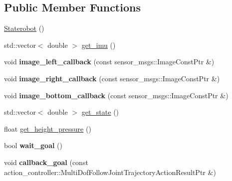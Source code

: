 \subsection*{Public Member Functions}
\begin{DoxyCompactItemize}
\item 
\hyperlink{class_staterobot_ab99a92f98d724c96989a744aee273155}{Staterobot} ()
\item 
std\-::vector$<$ double $>$ \hyperlink{class_staterobot_a50e002ec81917b295a87463127648a52}{get\-\_\-imu} ()
\item 
\hypertarget{class_staterobot_a4cb41f60186d02b210f354d0199584a4}{void {\bfseries image\-\_\-left\-\_\-callback} (const sensor\-\_\-msgs\-::\-Image\-Const\-Ptr \&)}\label{class_staterobot_a4cb41f60186d02b210f354d0199584a4}

\item 
\hypertarget{class_staterobot_af908b8a70811f3c0a48efe323610602d}{void {\bfseries image\-\_\-right\-\_\-callback} (const sensor\-\_\-msgs\-::\-Image\-Const\-Ptr \&)}\label{class_staterobot_af908b8a70811f3c0a48efe323610602d}

\item 
\hypertarget{class_staterobot_a8ad49fe9f855e5874d8736067fa7fac0}{void {\bfseries image\-\_\-bottom\-\_\-callback} (const sensor\-\_\-msgs\-::\-Image\-Const\-Ptr \&)}\label{class_staterobot_a8ad49fe9f855e5874d8736067fa7fac0}

\item 
std\-::vector$<$ double $>$ \hyperlink{class_staterobot_a51670cc44348eae6328f220421ea328f}{get\-\_\-state} ()
\item 
float \hyperlink{class_staterobot_a0318f7abf24c5c60aee915224af6af02}{get\-\_\-height\-\_\-pressure} ()
\item 
\hypertarget{class_staterobot_a4a44c24dd5cdb773aa40772d02b41720}{bool {\bfseries wait\-\_\-goal} ()}\label{class_staterobot_a4a44c24dd5cdb773aa40772d02b41720}

\item 
\hypertarget{class_staterobot_a37cbdfcb1cc30194f0fa0742952a0aad}{void {\bfseries callback\-\_\-goal} (const action\-\_\-controller\-::\-Multi\-Dof\-Follow\-Joint\-Trajectory\-Action\-Result\-Ptr \&)}\label{class_staterobot_a37cbdfcb1cc30194f0fa0742952a0aad}


\end{DoxyCompactItemize}
